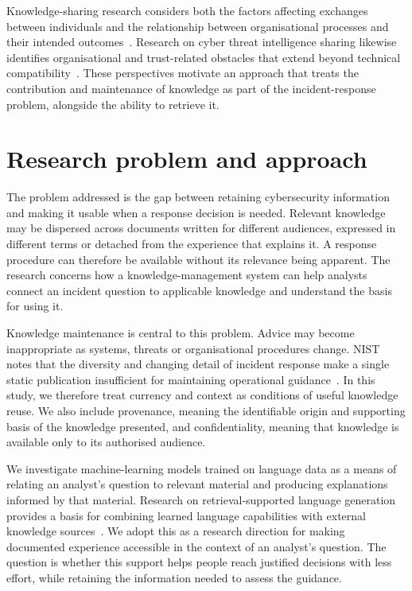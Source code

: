 Knowledge-sharing research considers both the factors affecting exchanges between individuals and the relationship between organisational processes and their intended outcomes~\cite{ref095,ref093}. Research on cyber threat intelligence sharing likewise identifies organisational and trust-related obstacles that extend beyond technical compatibility~\cite{ref098}. These perspectives motivate an approach that treats the contribution and maintenance of knowledge as part of the incident-response problem, alongside the ability to retrieve it.

\section{Research problem and approach}
The problem addressed is the gap between retaining cybersecurity information and making it usable when a response decision is needed. Relevant knowledge may be dispersed across documents written for different audiences, expressed in different terms or detached from the experience that explains it. A response procedure can therefore be available without its relevance being apparent. The research concerns how a knowledge-management system can help analysts connect an incident question to applicable knowledge and understand the basis for using it.

Knowledge maintenance is central to this problem. Advice may become inappropriate as systems, threats or organisational procedures change. NIST notes that the diversity and changing detail of incident response make a single static publication insufficient for maintaining operational guidance~\cite{nist2025incident}. In this study, we therefore treat currency and context as conditions of useful knowledge reuse. We also include provenance, meaning the identifiable origin and supporting basis of the knowledge presented, and confidentiality, meaning that knowledge is available only to its authorised audience.

We investigate machine-learning models trained on language data as a means of relating an analyst's question to relevant material and producing explanations informed by that material. Research on retrieval-supported language generation provides a basis for combining learned language capabilities with external knowledge sources~\cite{lewis2020rag}. We adopt this as a research direction for making documented experience accessible in the context of an analyst's question. The question is whether this support helps people reach justified decisions with less effort, while retaining the information needed to assess the guidance.

